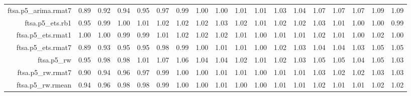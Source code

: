 \begin{tabular}{rrrrrrrrrrrrrrrrrr}
  ftsa.p5\_arima.rmat7 & 0.89 & 0.92 & 0.94 & 0.95 & 0.97 & 0.99 & 1.00 & 1.00 & 1.01 & 1.01 & 1.03 & 1.04 & 1.07 & 1.07 & 1.07 & 1.09 & 1.09 \\ 
  ftsa.p5\_ets.rb1 & 0.95 & 0.99 & 1.00 & 1.01 & 1.02 & 1.02 & 1.02 & 1.03 & 1.02 & 1.01 & 1.02 & 1.02 & 1.03 & 1.01 & 1.00 & 1.00 & 0.99 \\ 
  ftsa.p5\_ets.rmat1 & 1.00 & 1.00 & 0.99 & 0.99 & 1.01 & 1.02 & 1.02 & 1.02 & 1.01 & 1.00 & 1.01 & 1.01 & 1.02 & 1.01 & 1.00 & 1.02 & 1.00 \\ 
  ftsa.p5\_ets.rmat7 & 0.89 & 0.93 & 0.95 & 0.95 & 0.98 & 0.99 & 1.00 & 1.01 & 1.01 & 1.00 & 1.02 & 1.03 & 1.04 & 1.04 & 1.03 & 1.05 & 1.05 \\ 
  ftsa.p5\_rw & 0.95 & 0.98 & 0.98 & 1.01 & 1.07 & 1.06 & 1.04 & 1.04 & 1.02 & 1.01 & 1.02 & 1.03 & 1.05 & 1.05 & 1.04 & 1.05 & 1.03 \\ 
  ftsa.p5\_rw.rmat7 & 0.90 & 0.94 & 0.96 & 0.97 & 0.99 & 1.00 & 1.00 & 1.01 & 1.01 & 1.00 & 1.01 & 1.01 & 1.03 & 1.02 & 1.02 & 1.03 & 1.03 \\ 
  ftsa.p5\_rw.rmean & 0.94 & 0.96 & 0.98 & 0.98 & 0.99 & 1.00 & 1.00 & 1.01 & 1.00 & 1.00 & 1.01 & 1.01 & 1.02 & 1.01 & 1.01 & 1.02 & 1.02 \\ 
   \hline
\end{tabular}
